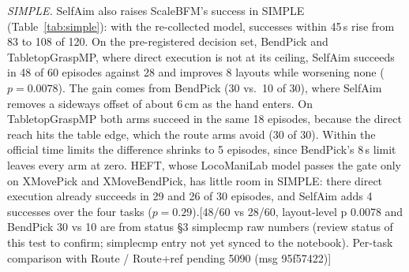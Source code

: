 \documentclass[conference]{IEEEtran}
\newif\ifdraft \drafttrue
\newcommand{\dnote}[1]{\ifdraft{\color{red}\footnotesize[#1]}\fi}
\begin{document}
\emph{SIMPLE.} SelfAim also raises ScaleBFM's success in SIMPLE (Table~\ref{tab:simple}): with the re-collected model, successes within 45\,s rise from 83 to 108 of 120. On the pre-registered decision set, BendPick and TabletopGraspMP, where direct execution is not at its ceiling, SelfAim succeeds in 48 of 60 episodes against 28 and improves 8 layouts while worsening none ($p=0.0078$). The gain comes from BendPick (30 vs.\ 10 of 30), where SelfAim removes a sideways offset of about 6\,cm as the hand enters. On TabletopGraspMP both arms succeed in the same 18 episodes, because the direct reach hits the table edge, which the route arms avoid (30 of 30). Within the official time limits the difference shrinks to 5 episodes, since BendPick's 8\,s limit leaves every arm at zero. HEFT, whose LocoManiLab model passes the gate only on XMovePick and XMoveBendPick, has little room in SIMPLE: there direct execution already succeeds in 29 and 26 of 30 episodes, and SelfAim adds 4 successes over the four tasks ($p=0.29$).\dnote{48/60 vs 28/60, layout-level p 0.0078 and BendPick 30 vs 10 are from status §3 simplecmp raw numbers (review status of this test to confirm; simplecmp entry not yet synced to the notebook). Per-task comparison with Route / Route+ref pending 5090 (msg 95f57422)}
\end{document}
